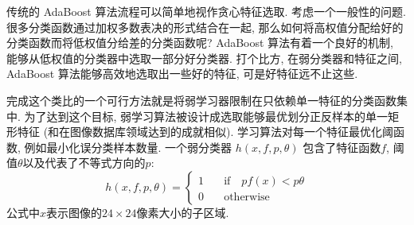\documentclass[a4paper,utf8,11pt]{ctexart}
\begin{document}
传统的 AdaBoost 算法流程可以简单地视作贪心特征选取. 考虑一个一般性的问题. 很多分类函数通过加权多数表决的形式结合在一起, 那么如何将高权值分配给好的分类函数而将低权值分给差的分类函数呢? 
AdaBoost 算法有着一个良好的机制, 能够从低权值的分类器中选取一部分好分类器. 打个比方, 在弱分类器和特征之间, AdaBoost 算法能够高效地选取出一些好的特征, 可是好特征远不止这些.

完成这个类比的一个可行方法就是将弱学习器限制在只依赖单一特征的分类函数集中. 为了达到这个目标, 弱学习算法被设计成选取能够最优划分正反样本的单一矩形特征 (和\citet{tieu2000boosting}在图像数据库领域达到的成就相似). 学习算法对每一个特征最优化阈函数, 例如最小化误分类样本数量. 一个弱分类器 $h(x,f,p,\theta)$ 包含了特征函数$f$, 阈值$\theta$以及代表了不等式方向的$p$:
\[
    h(x,f,p,\theta) =
    \begin{cases}
        1 &\quad\text{if}\quad pf(x)<p\theta \\
        0 &\quad\text{otherwise}
    \end{cases}
\]
公式中$x$表示图像的$24\times24$像素大小的子区域.
\end{document}
